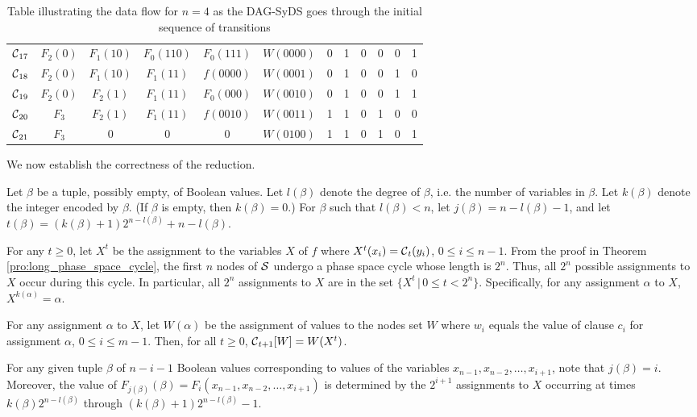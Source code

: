 \begin{table*}
\begin{center}
\begin{tabular}{|l | c c c c c c c c c c c |}
$\mbox{$\mathcal{C}$}_{17}$ & $F_2(0)$ & $F_1(10)$ & $F_0(110)$ & $F_0(111)$ & $W(0000)$ & 0 & 1 & 0 & 0 & 0 & 1 \\ 
$\mbox{$\mathcal{C}$}_{18}$ & $F_2(0)$ & $F_1(10)$ & $F_1(11)$ & $f(0000)$ & $W(0001)$ & 0 & 1 & 0 & 0 & 1 & 0 \\ 
$\mbox{$\mathcal{C}$}_{19}$ & $F_2(0)$ & $F_2(1)$ & $F_1(11)$ & $F_0(000)$ & $W(0010)$ & 0 & 1 & 0 & 0 & 1 & 1 \\ 
$\mbox{$\mathcal{C}$}_{20}$ & $F_3$ & $F_2(1)$ & $F_1(11)$ & $f(0010)$ & $W(0011)$ & 1 & 1 & 0 & 1 & 0 & 0 \\ 
$\mbox{$\mathcal{C}$}_{21}$ & $F_3$ & 0 & 0 & 0 & $W(0100)$ & 1 & 1 & 0 & 1 & 0 & 1 \\ \hline
\end{tabular}
\end{center}
\caption{Table illustrating the data flow for $n = 4$ 
as the DAG-SyDS \cals{} goes through the initial sequence of transitions}
\label{tab:dag_syds_trans}
\end{table*}
\fi

\medskip
We now establish the correctness of the reduction.

\smallskip

Let $\beta$ be a tuple, possibly empty, of Boolean values. 
Let  $l(\beta)$ denote the degree of $\beta$,
i.e. the number of variables in $\beta$.
Let  $k(\beta)$ denote the integer encoded by $\beta$.
(If  $\beta$ is empty, then $k(\beta) = 0$.)
For $\beta$ such that $l(\beta) < n$, 
let $j(\beta) = n - l(\beta) -1$,
and let $t(\beta) = (k(\beta)+1) 2^{n-l(\beta)} +n -l(\beta)$. 

For any $ t \geq 0$,
let  $X^t$ be the assignment to the variables $X$ of $f$ where 
$X^t(x_i) = \mbox{$\mathcal{C}$} _t(y_i)$, $ 0 \leq i \leq n-1$.
From the proof in Theorem \ref{pro:long_phase_space_cycle}, 
the first $n$ nodes of $\mbox{$\mathcal{S}$}$ undergo a phase space cycle whose length is $2^n$.
Thus, all $2^n$ possible assignments to $X$ occur during this cycle.
In particular, all $2^n$ assignments to $X$ are in the set $\{  X^t \, | \, 0 \leq t < 2^n \}$.
Specifically, for any assignment $\alpha$ to $X$, $X^{k(\alpha)} = \alpha$.


For any assignment $\alpha$ to $X$, 
let $W(\alpha)$ be the assignment of values to the nodes set $W$ 
where $w_i$ equals the value of clause $c_i$ for assignment $\alpha$, $ 0 \leq i \leq m-1$.
Then,  for all $t \geq 0$, $\mbox{$\mathcal{C}$}_{t+1}[W] = W(X^t)$.

For any given tuple $\beta$ of  $n-i-1$ Boolean values 
corresponding to values of the variables $x_{n-1}, x_{n-2}, \ldots , x_{i+1}$,
note that $j(\beta) = i$.
Moreover, the value of $F_{j(\beta)}(\beta) = F_i(x_{n-1}, x_{n-2}, \ldots , x_{i+1})$
is determined by the $2^{i+1}$ assignments to $X$  occurring at times 
$k(\beta) 2^{n-l(\beta)}$ through $(k(\beta)+1) 2^{n-l(\beta)}-1$.

